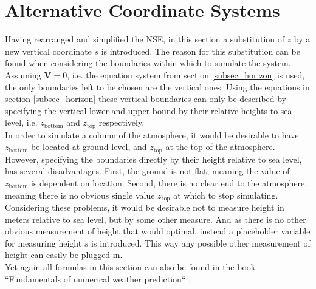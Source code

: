 \section{Alternative Coordinate Systems}
Having rearranged and simplified the NSE, in this section a substitution of $z$ by a new vertical coordinate $s$ is introduced.
The reason for this substitution can be found when considering the boundaries within which to simulate the system.
Assuming $\textbf{V}=0$, i.e. the equation system from section \ref{subsec_horizon} is used, the only boundaries left to be chosen are the vertical ones.
Using the equations in section \ref{subsec_horizon} these vertical boundaries can only be described by specifying the vertical lower and upper bound by their relative heights to sea level, i.e. $z_{\text{bottom}}$ and $z_{\text{top}}$ respectively.
\\
In order to simulate a column of the atmosphere, it would be desirable to have $z_{\text{bottom}}$ be located at ground level, and $z_{\text{top}}$ at the top of the atmosphere.
\\
However, specifying the boundaries directly by their height relative to sea level, has several disadvantages.
First, the ground is not flat, meaning the value of $z_{\text{bottom}}$ is dependent on location.
Second, there is no clear end to the atmosphere, meaning there is no obvious single value $z_{\text{top}}$ at which to stop simulating.
\\
Considering these problems, it would be desirable not to measure height in meters relative to sea level, but by some other measure.
And as there is no other obvious measurement of height that would optimal, instead a placeholder variable for measuring height $s$ is introduced.
This way any possible other measurement of height can easily be plugged in.\\
Yet again all formulas in this section can also be found in the book ``Fundamentals of numerical weather prediction`` \cite{coiffier2011fundamentals}.
